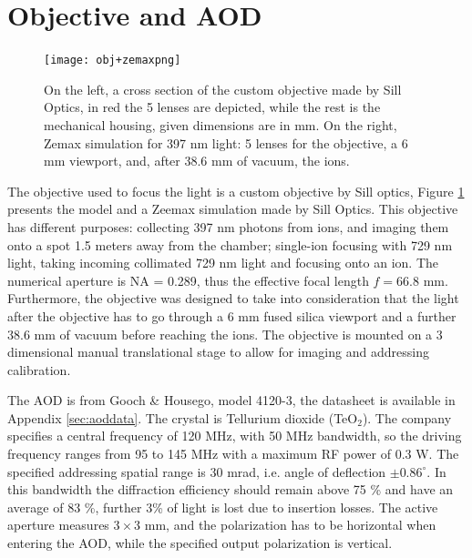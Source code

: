 \section{Objective and AOD}
\label{sec:obj}
%
\begin{figure}
      \centering
          \centering
          \texttt{[image: obj+zemaxpng]}
           \caption{On the left, a cross section of the custom objective made by Sill Optics, in red the 5 lenses are depicted, while the rest is the mechanical housing, given dimensions are in mm. On the right, Zemax simulation for 397 nm light: 5 lenses for the objective, a 6 mm viewport, and, after 38.6 mm of vacuum, the ions.}
          \label{objsection}
\end{figure}
The objective used to focus the light is a custom objective by Sill optics, Figure \ref{objsection} presents the model and a Zeemax simulation made by Sill Optics. This objective has different purposes: collecting 397 nm photons from ions, and imaging them onto a spot 1.5 meters away from the chamber; single-ion focusing with 729 nm light, taking incoming collimated 729 nm light and focusing onto an ion. The numerical aperture is NA = 0.289, thus the effective focal length $f = 66.8$ mm. Furthermore, the objective was designed to take into consideration that the light after the objective has to go through a 6 mm fused silica viewport and a further 38.6 mm of vacuum before reaching the ions. The objective is mounted on a 3 dimensional manual translational stage to allow for imaging and addressing calibration.\par
The AOD is from Gooch \& Housego, model 4120-3, the datasheet is available in Appendix \ref{sec:aoddata}. The crystal is Tellurium dioxide (TeO$_2$). The company specifies a central frequency of 120 MHz, with 50 MHz bandwidth, so the driving frequency ranges from 95 to 145 MHz with a maximum RF power of 0.3 W. The specified addressing spatial range is 30 mrad, i.e. angle of deflection $\pm 0.86^{\circ}$. In this bandwidth the diffraction efficiency should remain above 75 \% and have an average of 83 \%, further 3\% of light is lost due to insertion losses. The active aperture measures $3\times 3$ mm, and the polarization has to be horizontal when entering the AOD, while the specified output polarization is vertical.

